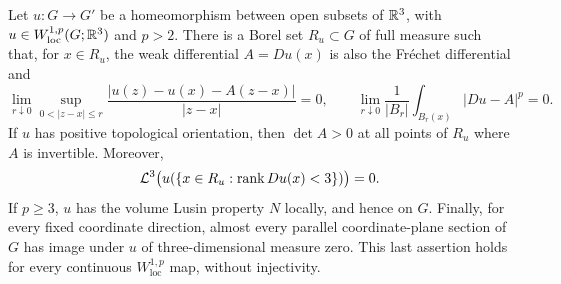 \begin{lemma}\label{hp:regularity}
Let $u:G\to G'$ be a homeomorphism between open subsets of $\mathbb R^3$,
with $u\in W^{1,p}_{\mathrm{loc}}(G;\mathbb R^3)$ and $p>2$.
There is a Borel set $R_u\subset G$ of full measure such that, for
$x\in R_u$, the weak differential $A=Du(x)$ is also the Fr\'echet
differential and
\begin{equation}\label{hp:regular-point-tests}
 \lim_{r\downarrow0}\sup_{0<|z-x|\le r}
 \frac{|u(z)-u(x)-A(z-x)|}{|z-x|}=0,
 \qquad
 \lim_{r\downarrow0}\frac{1}{|B_r|}
 \int_{B_r(x)}|Du-A|^p=0.
\end{equation}
If $u$ has positive topological orientation, then $\det A>0$ at
all points of $R_u$ where $A$ is invertible.  Moreover,
\begin{equation}\label{hp:deficient-image-null}
 \mathcal L^3\bigl(u(\{x\in R_u:\operatorname{rank} Du(x)<3\})\bigr)=0.
\end{equation}
If $p\ge3$, $u$ has the volume Lusin property $N$ locally, and hence
on $G$.  Finally, for every fixed coordinate direction, almost every
parallel coordinate-plane section of $G$ has image under $u$ of
three-dimensional measure zero.  This last assertion holds for every
continuous $W^{1,p}_{\mathrm{loc}}$ map, without injectivity.
\end{lemma}

